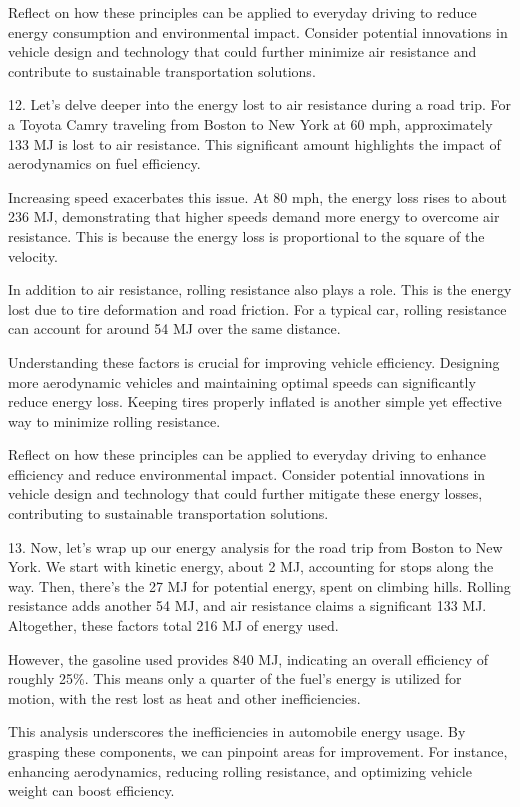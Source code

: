 \begin{tcolorbox}[size=title,opacityfill=0.05,breakable]
Reflect on how these principles can be applied to everyday driving to reduce energy consumption and environmental impact. Consider potential innovations in vehicle design and technology that could further minimize air resistance and contribute to sustainable transportation solutions.

12. Let's delve deeper into the energy lost to air resistance during a road trip. For a Toyota Camry traveling from Boston to New York at 60 mph, approximately 133 MJ is lost to air resistance. This significant amount highlights the impact of aerodynamics on fuel efficiency.

Increasing speed exacerbates this issue. At 80 mph, the energy loss rises to about 236 MJ, demonstrating that higher speeds demand more energy to overcome air resistance. This is because the energy loss is proportional to the square of the velocity.

In addition to air resistance, rolling resistance also plays a role. This is the energy lost due to tire deformation and road friction. For a typical car, rolling resistance can account for around 54 MJ over the same distance.

Understanding these factors is crucial for improving vehicle efficiency. Designing more aerodynamic vehicles and maintaining optimal speeds can significantly reduce energy loss. Keeping tires properly inflated is another simple yet effective way to minimize rolling resistance.

Reflect on how these principles can be applied to everyday driving to enhance efficiency and reduce environmental impact. Consider potential innovations in vehicle design and technology that could further mitigate these energy losses, contributing to sustainable transportation solutions.

13. Now, let's wrap up our energy analysis for the road trip from Boston to New York. We start with kinetic energy, about 2 MJ, accounting for stops along the way. Then, there's the 27 MJ for potential energy, spent on climbing hills. Rolling resistance adds another 54 MJ, and air resistance claims a significant 133 MJ. Altogether, these factors total 216 MJ of energy used.

However, the gasoline used provides 840 MJ, indicating an overall efficiency of roughly 25\%. This means only a quarter of the fuel's energy is utilized for motion, with the rest lost as heat and other inefficiencies.

This analysis underscores the inefficiencies in automobile energy usage. By grasping these components, we can pinpoint areas for improvement. For instance, enhancing aerodynamics, reducing rolling resistance, and optimizing vehicle weight can boost efficiency.


\end{tcolorbox}
